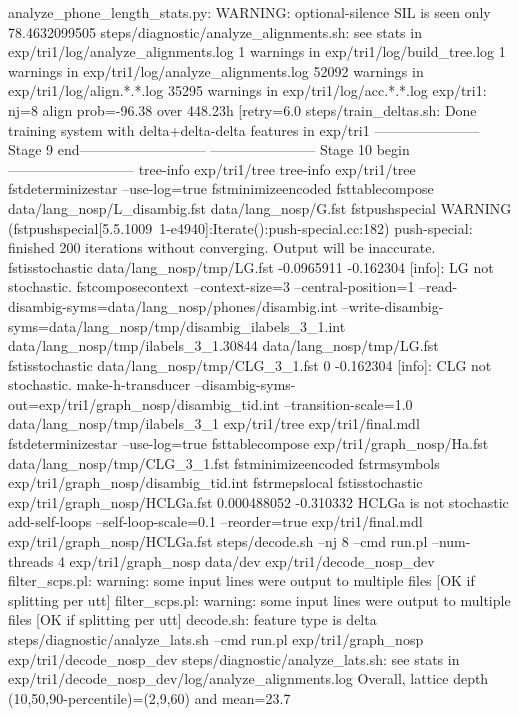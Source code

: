 analyze_phone_length_stats.py: WARNING: optional-silence SIL is seen only 78.4632099505%
steps/diagnostic/analyze_alignments.sh: see stats in exp/tri1/log/analyze_alignments.log
1 warnings in exp/tri1/log/build_tree.log
1 warnings in exp/tri1/log/analyze_alignments.log
52092 warnings in exp/tri1/log/align.*.*.log
35295 warnings in exp/tri1/log/acc.*.*.log
exp/tri1: nj=8 align prob=-96.38 over 448.23h [retry=6.0%
steps/train_deltas.sh: Done training system with delta+delta-delta features in exp/tri1
----------------------- Stage 9 end---------------------------
----------------------- Stage 10 begin---------------------------
tree-info exp/tri1/tree 
tree-info exp/tri1/tree 
fstdeterminizestar --use-log=true 
fstminimizeencoded 
fsttablecompose data/lang_nosp/L_disambig.fst data/lang_nosp/G.fst 
fstpushspecial 
WARNING (fstpushspecial[5.5.1009~1-e4940]:Iterate():push-special.cc:182) push-special: finished 200 iterations without converging.  Output will be inaccurate.
fstisstochastic data/lang_nosp/tmp/LG.fst 
-0.0965911 -0.162304
[info]: LG not stochastic.
fstcomposecontext --context-size=3 --central-position=1 --read-disambig-syms=data/lang_nosp/phones/disambig.int --write-disambig-syms=data/lang_nosp/tmp/disambig_ilabels_3_1.int data/lang_nosp/tmp/ilabels_3_1.30844 data/lang_nosp/tmp/LG.fst 
fstisstochastic data/lang_nosp/tmp/CLG_3_1.fst 
0 -0.162304
[info]: CLG not stochastic.
make-h-transducer --disambig-syms-out=exp/tri1/graph_nosp/disambig_tid.int --transition-scale=1.0 data/lang_nosp/tmp/ilabels_3_1 exp/tri1/tree exp/tri1/final.mdl 
fstdeterminizestar --use-log=true 
fsttablecompose exp/tri1/graph_nosp/Ha.fst data/lang_nosp/tmp/CLG_3_1.fst 
fstminimizeencoded 
fstrmsymbols exp/tri1/graph_nosp/disambig_tid.int 
fstrmepslocal 
fstisstochastic exp/tri1/graph_nosp/HCLGa.fst 
0.000488052 -0.310332
HCLGa is not stochastic
add-self-loops --self-loop-scale=0.1 --reorder=true exp/tri1/final.mdl exp/tri1/graph_nosp/HCLGa.fst 
steps/decode.sh --nj 8 --cmd run.pl --num-threads 4 exp/tri1/graph_nosp data/dev exp/tri1/decode_nosp_dev
filter_scps.pl: warning: some input lines were output to multiple files [OK if splitting per utt] 
filter_scps.pl: warning: some input lines were output to multiple files [OK if splitting per utt] 
decode.sh: feature type is delta
steps/diagnostic/analyze_lats.sh --cmd run.pl exp/tri1/graph_nosp exp/tri1/decode_nosp_dev
steps/diagnostic/analyze_lats.sh: see stats in exp/tri1/decode_nosp_dev/log/analyze_alignments.log
Overall, lattice depth (10,50,90-percentile)=(2,9,60) and mean=23.7
